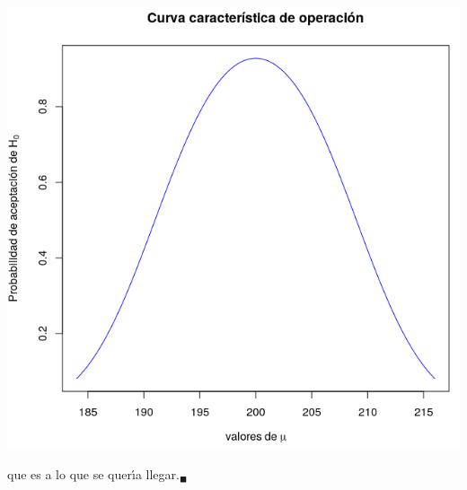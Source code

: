 \begin{solucion}
\begin{center}
  \includegraphics[scale=0.7]{Problema_18_02.png}
 \end{center}
 que es a lo que se quer\'{\i}a llegar.${}_{\blacksquare}$
\end{solucion}

